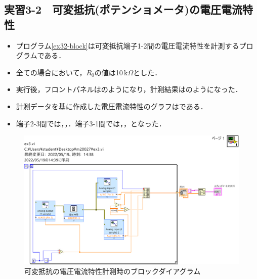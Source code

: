 \clearpage
\subsection{実習3-2　可変抵抗(ポテンショメータ)の電圧電流特性}
\begin{itemize}
	\item プログラム\ref{ex32-block}は可変抵抗端子1-2間の電圧電流特性を計測するプログラムである．
	\item 全ての場合において，$R_{0}$の値は10\,k\rm{$\Omega$}とした．
	\item 実行後，フロントパネルはのようになり，計測結果はのようになった．
	\item 計測データを基に作成した電圧電流特性のグラフはである．
	\item 端子2-3間では，，．端子3-1間では，，となった．
\end{itemize}

\begin{figure}[h]
\centering
\includegraphics[scale=0.5]{./fig/ex32-block.pdf}\\
\useMycounter[\label{ex32-block}]可変抵抗の電圧電流特性計測時のブロックダイアグラム
\end{figure}

